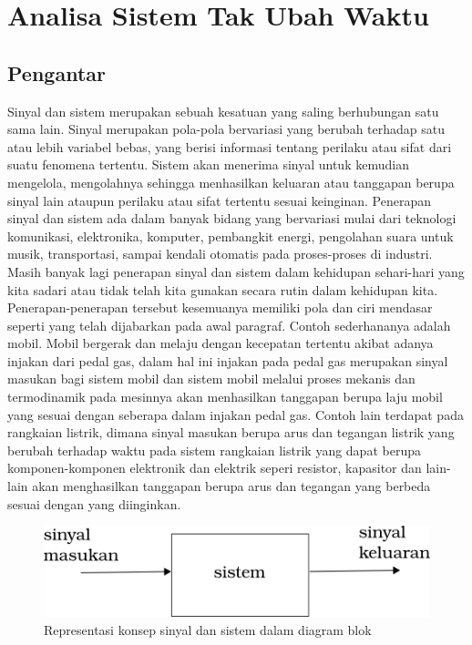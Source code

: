\chapter{Analisa Sistem Tak Ubah Waktu}

\section{Pengantar}
Sinyal dan sistem merupakan sebuah kesatuan yang saling berhubungan satu sama lain. Sinyal merupakan pola-pola bervariasi yang berubah terhadap satu atau lebih variabel bebas, yang berisi informasi tentang perilaku atau sifat dari suatu fenomena tertentu. Sistem akan menerima sinyal untuk kemudian mengelola, mengolahnya sehingga menhasilkan keluaran atau tanggapan berupa sinyal lain ataupun perilaku atau sifat tertentu sesuai keinginan. Penerapan sinyal dan sistem ada dalam banyak bidang yang bervariasi mulai dari teknologi komunikasi, elektronika, komputer, pembangkit energi, pengolahan suara untuk musik, transportasi, sampai kendali otomatis pada proses-proses di industri. Masih banyak lagi penerapan sinyal dan sistem dalam kehidupan sehari-hari yang kita sadari atau tidak telah kita gunakan secara rutin dalam kehidupan kita. Penerapan-penerapan tersebut kesemuanya memiliki pola dan ciri mendasar seperti yang telah dijabarkan pada awal paragraf. Contoh sederhananya adalah mobil. Mobil bergerak dan melaju dengan kecepatan tertentu akibat adanya injakan dari pedal gas, dalam hal ini injakan pada pedal gas merupakan sinyal masukan bagi sistem mobil dan sistem mobil melalui proses mekanis dan termodinamik pada mesinnya akan menhasilkan tanggapan berupa laju mobil yang sesuai dengan seberapa dalam injakan pedal gas. Contoh lain terdapat pada rangkaian listrik, dimana sinyal masukan berupa arus dan tegangan listrik yang berubah terhadap waktu pada sistem rangkaian listrik yang dapat berupa komponen-komponen elektronik dan elektrik seperi resistor, kapasitor dan lain-lain akan menghasilkan tanggapan berupa arus dan tegangan yang berbeda sesuai dengan yang diinginkan. 

\begin{figure}[!h]
\centering
\includegraphics[scale=0.7]{pict/sinyalsistem}
\caption{Representasi konsep sinyal dan sistem dalam diagram blok}\label{sinyalsistem}
\end{figure}

